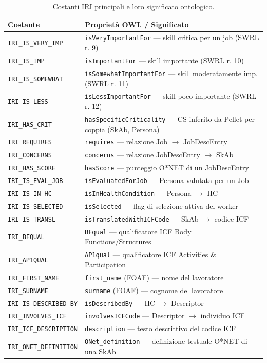 \documentclass[a4paper,12pt]{article}
\begin{document}
\begin{table}[H]
\centering\small
\caption{Costanti IRI principali e loro significato ontologico.}
\begin{tabular}{L{4.5cm} L{8cm}}
\toprule
\textbf{Costante} & \textbf{Propriet\`{a} OWL / Significato} \\
\midrule
\texttt{IRI\_IS\_VERY\_IMP} & \texttt{isVeryImportantFor} --- skill critica per un job (SWRL r. 9) \\
\texttt{IRI\_IS\_IMP}       & \texttt{isImportantFor} --- skill importante (SWRL r. 10) \\
\texttt{IRI\_IS\_SOMEWHAT}  & \texttt{isSomewhat\-ImportantFor} --- skill moderatamente imp. (SWRL r. 11) \\
\texttt{IRI\_IS\_LESS}      & \texttt{isLessImportantFor} --- skill poco importante (SWRL r. 12) \\
\texttt{IRI\_HAS\_CRIT}     & \texttt{hasSpecificCriticality} --- CS inferito da Pellet per coppia (SkAb, Persona) \\
\texttt{IRI\_REQUIRES}      & \texttt{requires} --- relazione Job $\rightarrow$ JobDescEntry \\
\texttt{IRI\_CONCERNS}      & \texttt{concerns} --- relazione JobDescEntry $\rightarrow$ SkAb \\
\texttt{IRI\_HAS\_SCORE}    & \texttt{hasScore} --- punteggio O*NET di un JobDescEntry \\
\texttt{IRI\_IS\_EVAL\_JOB} & \texttt{isEvaluatedForJob} --- Persona valutata per un Job \\
\texttt{IRI\_IS\_IN\_HC}    & \texttt{isInHealthCondition} --- Persona $\rightarrow$ HC \\
\texttt{IRI\_IS\_SELECTED}  & \texttt{isSelected} --- flag di selezione attiva del worker \\
\texttt{IRI\_IS\_TRANSL}    & \texttt{isTranslatedWithICFCode} --- SkAb $\rightarrow$ codice ICF \\
\texttt{IRI\_BFQUAL}        & \texttt{BFqual} --- qualificatore ICF Body Functions/Structures \\
\texttt{IRI\_AP1QUAL}       & \texttt{AP1qual} --- qualificatore ICF Activities \& Participation \\
\texttt{IRI\_FIRST\_NAME}   & \texttt{first\_name} (FOAF) --- nome del lavoratore \\
\texttt{IRI\_SURNAME}       & \texttt{surname} (FOAF) --- cognome del lavoratore \\
\texttt{IRI\_IS\_DESCRIBED\_BY} & \texttt{isDescribedBy} --- HC $\rightarrow$ Descriptor \\
\texttt{IRI\_INVOLVES\_ICF} & \texttt{involvesICFCode} --- Descriptor $\rightarrow$ individuo ICF \\
\texttt{IRI\_ICF\_DESCRIPTION} & \texttt{description} --- testo descrittivo del codice ICF \\
\texttt{IRI\_ONET\_DEFINITION} & \texttt{ONet\_definition} --- definizione testuale O*NET di una SkAb \\
\bottomrule
\end{tabular}
\end{table}
\end{document}
